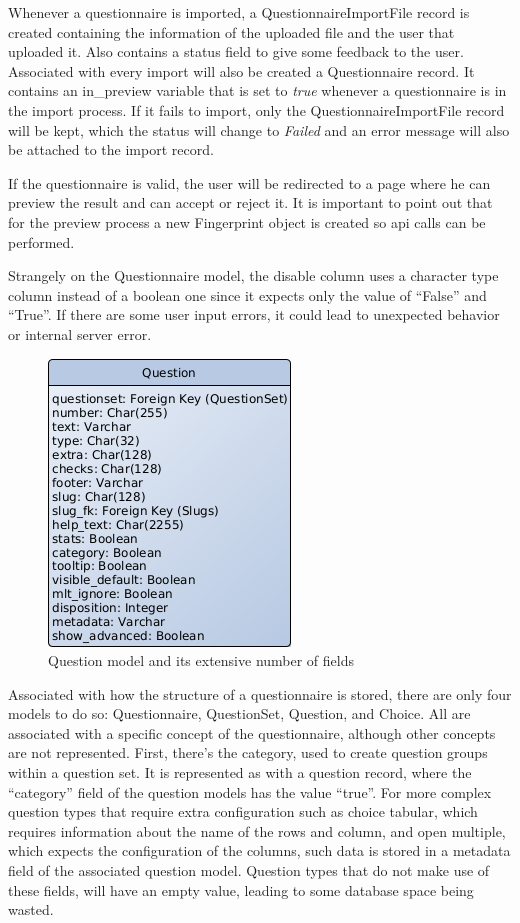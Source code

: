 Whenever a questionnaire is imported, a QuestionnaireImportFile record is created containing the information of the uploaded file and the user that uploaded it.
Also contains a status field to give some feedback to the user.
Associated with every import will also be created a Questionnaire record.
It contains an in\_preview variable that is set to \textit{true} whenever a questionnaire is in the import process.
If it fails to import, only the QuestionnaireImportFile record will be kept, which the status will change to \textit{Failed} and an error message will also be attached to the import record.

If the questionnaire is valid, the user will be redirected to a page where he can preview the result and can accept or reject it.
It is important to point out that for the preview process a new Fingerprint object is created so \gls{api} calls can be performed.

Strangely on the Questionnaire model, the disable column uses a character type column instead of a boolean one since it expects only the value of ``False'' and ``True''.
If there are some user input errors, it could lead to unexpected behavior or internal server error.


\begin{figure}[H]
    \center
    \includegraphics[width=.3\textwidth]{question-model}
    \caption{Question model and its extensive number of fields}
    \label{fig:question-model}
\end{figure}

Associated with how the structure of a questionnaire is stored, there are only four models to do so: Questionnaire, QuestionSet, Question, and Choice.
All are associated with a specific concept of the questionnaire, although other concepts are not represented.
First, there's the category, used to create question groups within a question set.
It is represented as with a question record, where the ``category'' field of the question models has the value ``true''.
For more complex question types that require extra configuration such as choice tabular, which requires information about the name of the rows and column, and open multiple, which expects the configuration of the columns, such data is stored in a metadata field of the associated question model.
Question types that do not make use of these fields, will have an empty value, leading to some database space being wasted.

